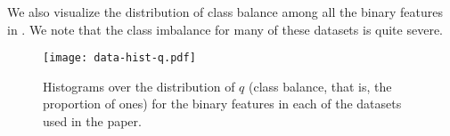 We also visualize the distribution of class balance among all the binary features in
. We note that the class imbalance for many of these datasets is
quite severe.

\begin{figure}[htpb]
  \centering
  \texttt{[image: data-hist-q.pdf]}
  \caption{%
    Histograms over the distribution of \(q\) (class balance, that is, the
    proportion of ones) for the binary features in each of the datasets
    used in the paper.
  }
  \label{fig:data-hist-q}
\end{figure}

